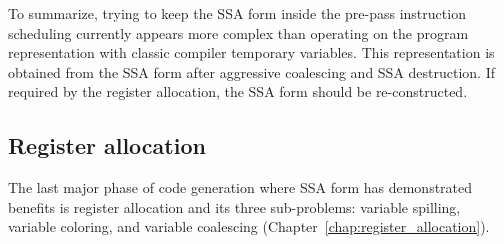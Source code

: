 To summarize, trying to keep the SSA form inside the pre-pass instruction scheduling
currently appears more complex than operating on the program representation with
classic compiler temporary variables. This representation is obtained from the
SSA form after aggressive coalescing and SSA destruction. If required by the
register allocation, the SSA form should be re-constructed.

\subsection{Register allocation}

The last major phase of code generation where SSA form has demonstrated benefits
is register allocation and its three sub-problems: variable spilling, variable
coloring, and variable coalescing (Chapter~\ref{chap:register_allocation}).


